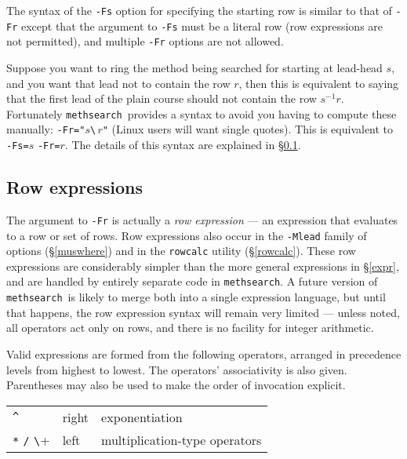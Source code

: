 \documentclass[a4paper,11pt,oneside]{book}
\makeatletter
\newcommand{\oidx}[2]{\index{#1@{\hspace*{-\optwidth}\texttt{-}#2}|ulink}}
\def\methsearch{\texttt{meth\-search}}
\newcommand{\sref}[1]{\hyperref[#1]{\S\ref{#1}}}
\makeatother
\begin{document}
The syntax of the \verb+-Fs+\oidx{Fs}{\texttt{Fs}} option for specifying
the starting row is similar to that of \verb+-Fr+ except that the
argument to \verb+-Fs+ must be a literal row (row expressions are not 
permitted), and multiple \verb+-Fr+ options are not allowed.

Suppose you want to ring the method being searched for starting at lead-head 
$s$, and you want that lead not to contain the row $r$, then this is 
equivalent to saying that the first lead of the plain course should not 
contain the row $s^{-1} r$.
Fortunately \methsearch\ provides a syntax to avoid you having to
compute these manually: \verb+-Fr="+$s$\verb+\+$\,r$\verb+"+ (Linux users
will want single quotes).  This is equivalent to \verb+-Fs=+$s$ \verb+-Fr=+$r$.
The details of this syntax are explained in \sref{rowexpr}.

\subsection{Row expressions}\label{rowexpr}

The argument to \verb+-Fr+ is actually a \textit{row expression}%
 --- an expression that evaluates 
to a row or set of rows.  Row expressions also occur in the \verb+-Mlead+
family of options (\sref{muswhere}) and in the \verb+rowcalc+ utility
(\sref{rowcalc}).
These row expressions are considerably simpler than the more general 
expressions in \sref{expr}, and are handled by entirely separate code in
\methsearch.  A future version of \methsearch\ is likely to merge both
into a single expression language, but until that happens, the row expression
syntax will remain very limited --- unless noted, all operators act only on 
rows, and there is no facility for integer arithmetic.

Valid expressions are formed from the following operators, 
arranged in precedence levels from 
highest to lowest.  The operators' associativity
is also given.  Parentheses may also be used to make the order of invocation
explicit.

\begin{tabular}{l@{\quad}l@{\quad}l}
\verb+^+&                   right& exponentiation\\
\verb+*+ \verb+/+ \verb+\+& left&  multiplication-type operators\\
\end{tabular}
\end{document}
